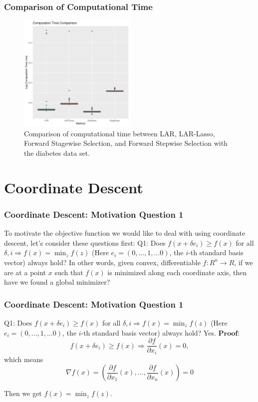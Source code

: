 \begin{frame}
    \frametitle{Comparison of Computational Time}
\begin{figure}[!htbp]
    \begin{center}
        \includegraphics[width=0.5\textwidth]{img/lars_time.pdf}
    \end{center}
    \caption{Comparison of computational time between LAR, LAR-Lasso, Forward Stagewise Selection, and Forward Stepwise Selection with the diabetes data set.}\label{fig:lars_time}
\end{figure}
\end{frame}

\section{Coordinate Descent}
\begin{frame}
    \frametitle{Coordinate Descent: Motivation Question 1}
To motivate the objective function we would like to deal with using coordinate descent, let's consider these questions first:
\newline\newline
Q1: Does $f\left(x+\delta e_i\right) \geq f(x)$ for all $\delta, i \Longrightarrow f(x)=\min _z f(z)$ (Here $e_i=(0, \ldots, 1, \ldots 0)$, the $i$-th standard basis vector) always hold?
\newline\newline
In other words, given convex, differentiable $f: R^n \rightarrow R$, if we are at a point $x$ such that $f(x)$ is minimized along each coordinate axis, then have we found a global minimizer?
\end{frame}

\begin{frame}
    \frametitle{Coordinate Descent: Motivation Question 1}
Q1: Does $f\left(x+\delta e_i\right) \geq f(x)$ for all $\delta, i \Longrightarrow f(x)=\min _z f(z)$ (Here $e_i=(0, \ldots, 1, \ldots 0)$, the $i$-th standard basis vector) always hold?
\newline\newline
Yes. $\textbf{Proof}$:
$$
f\left(x+\delta e_i\right) \geq f(x) \Longrightarrow \frac{\partial f}{\partial x_i}(x)=0,
$$
which means
$$
\nabla f(x)=\left(\frac{\partial f}{\partial x_1}(x), \ldots, \frac{\partial f}{\partial x_n}(x)\right)=0
$$

Then we get $f(x)=\min _z f(z)$.
\end{frame}

